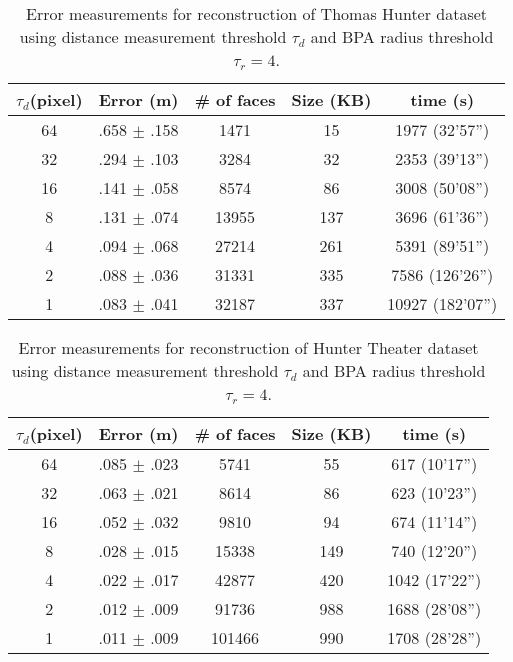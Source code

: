 \setlength{\tabcolsep}{4pt}
\begin{table}[hbtp]
\begin{center}
\begin{tabular}[t]{||c||c|c|c|c||}
\hline
$\tau_d $(pixel) & Error (m)& \# of faces & Size (KB) & time (s) \\ \hline \hline
64 & .658 $\pm$ .158 & 1471  & 15  & 1977  (32'57'') \\ \hline
32 & .294 $\pm$ .103 & 3284  & 32  & 2353  (39'13'') \\ \hline
16 & .141 $\pm$ .058 & 8574  & 86  & 3008  (50'08'') \\ \hline
8  & .131 $\pm$ .074 & 13955 & 137 & 3696  (61'36'') \\ \hline
4  & .094 $\pm$ .068 & 27214 & 261 & 5391  (89'51'') \\ \hline
2  & .088 $\pm$ .036 & 31331 & 335 & 7586  (126'26'')\\ \hline
1  & .083 $\pm$ .041 & 32187 & 337 & 10927 (182'07'')\\ \hline
\end{tabular}
\end{center}
\caption{Error measurements for reconstruction of Thomas Hunter dataset using
distance measurement threshold $\tau_d$ and BPA radius threshold $\tau_r = 4$.}
\label{tbl:em}
\end{table}
\setlength{\tabcolsep}{1.4pt}


\setlength{\tabcolsep}{4pt}
\begin{table}[hbtp]
\begin{center}
\begin{tabular}[t]{||c||c|c|c|c||}
\hline
$\tau_d $(pixel) & Error (m)& \# of faces & Size (KB) & time (s) \\ \hline \hline
64 & .085 $\pm$ .023 & 5741   & 55  & 617  (10'17'') \\ \hline
32 & .063 $\pm$ .021 & 8614   & 86  & 623  (10'23'') \\ \hline  %
16 & .052 $\pm$ .032 & 9810   & 94  & 674  (11'14'') \\ \hline
8  & .028 $\pm$ .015 & 15338  & 149 & 740  (12'20'') \\ \hline
4  & .022 $\pm$ .017 & 42877  & 420 & 1042 (17'22'') \\ \hline
2  & .012 $\pm$ .009 & 91736  & 988 & 1688 (28'08'') \\ \hline %
1  & .011 $\pm$ .009 & 101466 & 990 & 1708 (28'28'') \\ \hline
\end{tabular}
\end{center}
\caption{Error measurements for reconstruction of Hunter Theater dataset using
distance measurement threshold $\tau_d$ and BPA radius threshold $\tau_r = 4$.}
\label{tbl:em_theater}
\end{table}
\setlength{\tabcolsep}{1.4pt}

